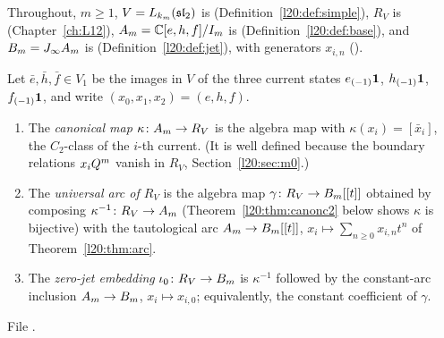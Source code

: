 Throughout, $m\ge1$, $V=L_{k_m}(\mathfrak{sl}_2)$ is  (Definition~\ref{l20:def:simple}),
$R_V$ is  (Chapter~\ref{ch:L12}), $A_m={\mathbb{C}}[e,h,f]/I_m$ is 
(Definition~\ref{l20:def:base}), and $B_m=J_\infty A_m$ is 
(Definition~\ref{l20:def:jet}), with generators $x_{i,n}$ ().

\begin{definition}\label{l20:def:canonc2}
Let $\bar e,\bar h,\bar f\in V_1$ be the images in $V$ of the three current states $e_{(-1)}\mathbf{1}$, $h_{(-1)}\mathbf{1}$,
$f_{(-1)}\mathbf{1}$, and write $(x_0,x_1,x_2)=(e,h,f)$.
\begin{enumerate}
\item The \emph{canonical map} $\kappa\colon A_m\to R_V$ is the algebra map with $\kappa(x_i)=[\bar x_i]$, the $C_2$-class
  of the $i$-th current. (It is well defined because the boundary relations $x_iQ^m$ vanish in $R_V$,
  Section~\ref{l20:sec:m0}.)
\item The \emph{universal arc of $R_V$} is the algebra map
  $\gamma\colon R_V\to B_m[[t]]$ obtained by composing $\kappa^{-1}\colon R_V\to A_m$ (Theorem~\ref{l20:thm:canonc2}
  below shows $\kappa$ is bijective) with the tautological arc $A_m\to B_m[[t]]$,
  $x_i\mapsto\sum_{n\ge0}x_{i,n}t^n$ of Theorem~\ref{l20:thm:arc}.
\item The \emph{zero-jet embedding} $\iota_0\colon R_V\to B_m$ is $\kappa^{-1}$ followed by the constant-arc inclusion
  $A_m\to B_m$, $x_i\mapsto x_{i,0}$; equivalently, the constant coefficient of $\gamma$.
\end{enumerate}
\end{definition}
\noindent File .
